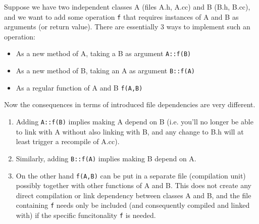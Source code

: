 \documentclass[11pt]{book}
\begin{document}
Suppose we have two independent classes A (files A.h, A.cc) and B (B.h, B.cc),
and we want to add some operation {\tt f} that requires instances of A and B
as arguments (or return value). There are essentially 3 ways
to implement such an operation:
\begin{itemize}
\item As a new method of A, taking a B as argument {\tt A::f(B)}
\item As a new method of B, taking an A as argument {\tt B::f(A)}
\item As a regular function of A and B {\tt f(A,B)}
\end{itemize}

Now the consequences in terms of introduced file dependencies are very
different.
\begin{enumerate}
\item Adding {\tt A::f(B)} implies making A depend on B (i.e. you'll no
  longer be able to link with A without also linking with B, and any change
  to B.h will at least trigger a recompile of A.cc).
\item Similarly, adding {\tt B::f(A)} implies making B depend on A.
\item On the other hand {\tt f(A,B)} can be put in a separate file
  (compilation unit) possibly together with other functions of A and
  B. This does not create any direct compilation or link dependency between
  classes A and B, and the file containing {\tt f} needs only be included (and consequently
  compiled and linked with) if the specific funcitonality {\tt f} is
  needed.
\end{enumerate}
\end{document}
